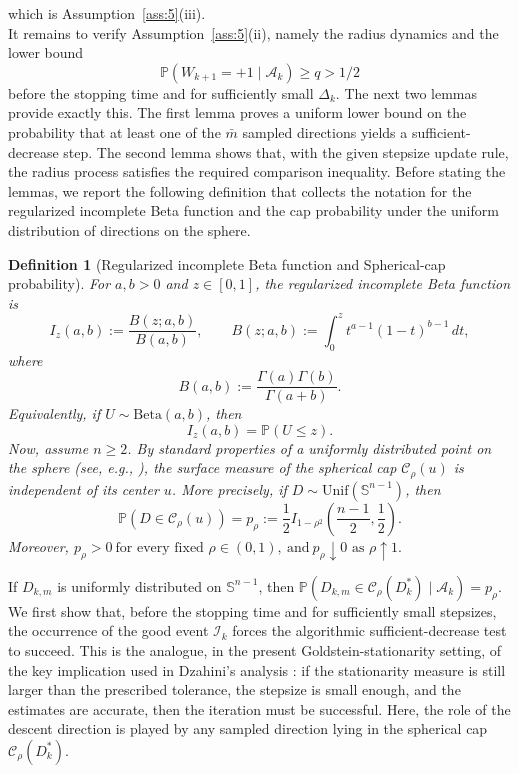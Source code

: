 \documentclass[11pt,a4paper]{article}
\newtheorem{definition}{Definition}[section]
\begin{document}
which is Assumption~\ref{ass:5}(iii).\\
It remains to verify Assumption~\ref{ass:5}(ii), namely the radius dynamics and
the lower bound
\[
    \mathbb P(W_{k+1}=+1\mid\mathcal A_k)\ge q>1/2
\]
before the stopping time and for sufficiently small \(\Delta_k\). The next two
lemmas provide exactly this. The first lemma proves a uniform lower bound
on the probability that at least one of the \(\bar{m}\) sampled directions yields a
sufficient-decrease step. The second lemma shows that, with the given stepsize update rule, the radius process satisfies the required comparison
inequality. Before stating the lemmas, we report the following definition that collects the
notation for the regularized incomplete Beta function and the cap
probability under the uniform distribution of directions on the sphere.

\begin{definition}[Regularized incomplete Beta function and Spherical-cap probability]
\label{def:reg-inc-beta-funct}
 For \(a,b>0\) and \(z\in[0,1]\), the
\emph{regularized incomplete Beta function} is
\[
    I_z(a,b)
    :=
    \frac{B(z;a,b)}{B(a,b)},
    \qquad
    B(z;a,b)
    :=
    \int_0^z t^{a-1}(1-t)^{b-1}\,dt,
\]
where
\[
    B(a,b)
    :=
    \frac{\Gamma(a)\Gamma(b)}{\Gamma(a+b)}.
\]
Equivalently, if \(U\sim\mathrm{Beta}(a,b)\), then
\[
    I_z(a,b)=\mathbb P(U\le z).
\]
Now, assume \(n\ge2\). By standard properties of a uniformly distributed point on the sphere (see, e.g., \cite[Chapter~9]{MardiaJupp2000}),
the surface measure of the spherical cap \(\mathcal C_\rho(u)\) is independent
of its center \(u\). More precisely, if \(D\sim\mathrm{Unif}(\mathbb S^{n-1})\), then
\begin{equation}\label{capprob}
    \mathbb P(D\in\mathcal C_\rho(u))
    =
    p_\rho
    :=
    \frac12
    I_{1-\rho^2}
    \left(
        \frac{n-1}{2},
        \frac12
    \right).
\end{equation}
 Moreover,
$p_\rho>0
    \ \text{for every fixed }\rho\in(0,1),
    \ \text{and}\ 
    p_\rho\downarrow0
     \text{ as }\rho\uparrow1.$

\end{definition}
If
\(D_{k,m}\) is uniformly distributed on \(\mathbb S^{n-1}\), then $\mathbb P(D_{k,m}\in \mathcal C_\rho(D_k^*)\mid\mathcal A_k)
    =
    p_\rho.$
We first show that, before the stopping time and for sufficiently small
stepsizes, the occurrence of the good event \(\mathcal I_k\) forces the algorithmic
sufficient-decrease test to succeed. This is the analogue, in the present
Goldstein-stationarity setting, of the key implication used in Dzahini's
analysis \cite{MR4359469}: if the stationarity measure is still larger than the prescribed
tolerance, the stepsize is small enough, and the estimates are accurate, then
the iteration must be successful. Here, the role of the descent direction is
played by any sampled direction lying in the spherical cap~
\(\mathcal C_\rho(D_k^\ast)\).
\end{document}
